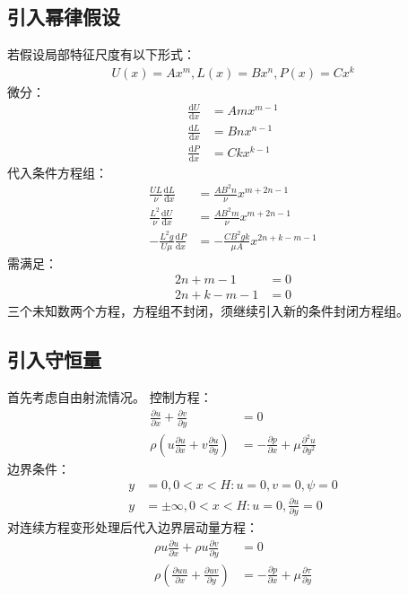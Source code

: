 \subsection{引入幂律假设}
若假设局部特征尺度有以下形式：
\begin{align}
    U(x)=Ax^{m},L(x)=Bx^{n},P(x)=Cx^{k}
\end{align}
微分：
\begin{align}
    \frac{\mathrm{d}U}{\mathrm{d}x}&=Amx^{m-1}\\
    \frac{\mathrm{d}L}{\mathrm{d}x}&=Bnx^{n-1}\\
    \frac{\mathrm{d}P}{\mathrm{d}x}&=Ckx^{k-1}
\end{align}
代入条件方程组：
\begin{align}
    \frac{UL}{\nu}\frac{\mathrm{d}L}{\mathrm{d}x}&=\frac{AB^{2}n}{\nu}x^{m+2n-1}\\
    \frac{L^{2}}{\nu}\frac{\mathrm{d}U}{\mathrm{d}x}&=\frac{AB^{2}m}{\nu}x^{m+2n-1}\\
    -\frac{L^{2}g}{U\mu}\frac{\mathrm{d} P}{\mathrm{d}x}&=-\frac{CB^{2}gk}{\mu A}x^{2n+k-m-1}
\end{align}
需满足：
\begin{align}
    2n+m-1&=0\\
    2n+k-m-1&=0
\end{align}
三个未知数两个方程，方程组不封闭，须继续引入新的条件封闭方程组。

\subsection{引入守恒量}
首先考虑自由射流情况。
控制方程：
\begin{align}
    \frac{\partial u}{\partial x}+\frac{\partial v}{\partial y}&=0\\
    \rho\left(u\frac{\partial u}{\partial x}+v\frac{\partial u}{\partial y}\right)&=-\frac{\partial p}{\partial x}+\mu\frac{\partial^{2} u}{\partial y^{2}}
\end{align}
边界条件：
\begin{align}
    y&=0, 0<x<H: u=0,v=0,\psi=0\\
    y&=\pm\infty,0<x<H: u=0, \frac{\partial u}{\partial y}=0
\end{align}
对连续方程变形处理后代入边界层动量方程：
\begin{align}
    \rho u \frac{\partial u}{\partial x}+\rho u\frac{\partial v}{\partial y}&=0\\
    \rho\left(\frac{\partial uu}{\partial x}+\frac{\partial uv}{\partial y}\right)&=-\frac{\partial p}{\partial x}+\mu\frac{\partial \tau}{\partial y}
\end{align}

